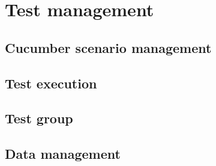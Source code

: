 \section{Test management}\label{sec:test-management}

\subsection{Cucumber scenario management}\label{subsec:cucumber-scenario-management}

\subsection{Test execution}\label{subsec:test-execution}

\subsection{Test group}\label{subsec:test-group}

\subsection{Data management}\label{subsec:data-management}